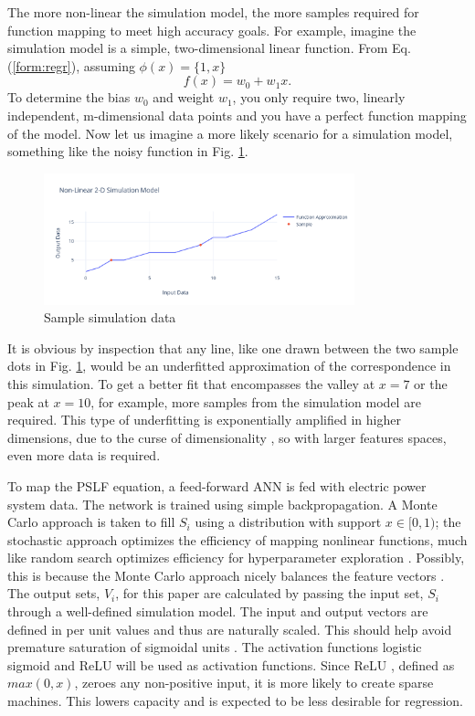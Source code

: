 \documentclass[conference]{IEEEtran}
\begin{document}
The more non-linear the simulation model, the more samples required for function mapping to meet high accuracy goals. For example, imagine the simulation model is a simple, two-dimensional linear function. From Eq. (\ref{form:regr}), assuming $\phi(x) = \{1, x\}$
\begin{equation} f(x) = w_{0} + w_{1} x. \label{form: line} \end{equation}
To determine the bias $w_{0}$ and weight $w_{1}$, you only require two, linearly independent, m-dimensional data points and you have a perfect function mapping of the model. Now let us imagine a more likely scenario for a simulation model,  something like the noisy function in Fig. \ref{fig:simdata}.

\setcounter{figure}{1} %
\begin{figure}[H]
	\centering
	\includegraphics[width=9cm]{simdata.pdf}
	\caption{Sample simulation data}
	\label{fig:simdata}
\end{figure}

It is obvious by inspection that any line, like one drawn between the two sample dots in Fig. \ref{fig:simdata}, would be an underfitted approximation of the correspondence in this simulation. To get a better fit that encompasses the valley at $x = 7$ or the peak at $x  =10$, for example, more samples from the simulation model are required. This type of underfitting is exponentially amplified in higher dimensions, due to the curse of dimensionality \cite{geen2011}, so with larger features spaces, even more data is required.

To map the PSLF equation, a feed-forward ANN is fed with electric power system data. The network is trained using simple backpropagation. A Monte Carlo approach is taken to fill $S_{i}$ using a distribution with support $x \in [0, 1)$; the stochastic approach optimizes the efficiency of mapping nonlinear functions, much like random search optimizes efficiency for hyperparameter exploration \cite{berg2012}. Possibly, this is because the Monte Carlo approach nicely balances the feature vectors \cite{kraw2016}. The output sets, $V_{i}$, for this paper are calculated by passing the input set, $S_{i}$ through a well-defined simulation model. The input and output vectors are defined in per unit values and thus are naturally scaled. This should help avoid premature saturation of sigmoidal units \cite{khom2007}. The activation functions logistic sigmoid and ReLU will be used as activation functions. Since ReLU \cite{nair2010}, defined as $max(0,x)$, zeroes any non-positive input, it is more likely to create sparse machines. This lowers capacity and is expected to be less desirable for regression.
\end{document}
